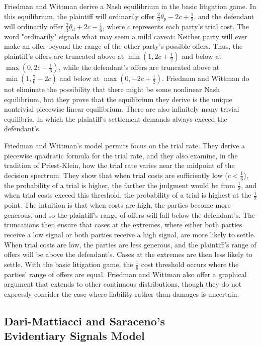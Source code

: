 \documentclass{article}
\begin{document}
Friedman and Wittman derive a Nash equilibrium in the basic litigation game. In this equilibrium, the plaintiff will ordinarily offer $\frac{2}{3}\theta_p -2c + \frac{1}{2}$, and the defendant will ordinarily offer $\frac{2}{3}\theta_d + 2c - \frac{1}{6}$, where $c$ represents each party's trial cost.  The word "ordinarily" signals what may seem a mild caveat: Neither party will ever make an offer beyond the range of the other party's possible offers. Thus, the plaintiff's offers are truncated above at $\min(1, 2c + \frac{1}{2})$ and below at $\max(0, 2c - \frac{1}{6})$, while the defendant's offers are truncated above at $\min(1, \frac{7}{6} - 2c)$ and below at $\max(0, -2c + \frac{1}{2})$. Friedman and Wittman do not eliminate the possibility that there might be some nonlinear Nash equilibrium, but they prove that the equilibrium they derive is the unique nontrivial piecewise linear equilibrium. There are also infinitely many trivial equilibria, in which the plaintiff's settlement demands always exceed the defendant's. 

Friedman and Wittman's model permits focus on the trial rate. They derive a piecewise quadratic formula for the trial rate, and they also examine, in the tradition of Priest-Klein, how the trial rate varies near the midpoint of the decision spectrum. They show that when trial costs are sufficiently low ($c < \frac{1}{6}$), the probability of a trial is higher, the farther the judgment would be from $\frac{1}{2}$, and when trial costs exceed this threshold, the probability of a trial is highest at the $\frac{1}{2}$ point. The intuition is that when costs are high, the parties become more generous, and so the plaintiff's range of offers will fall below the defendant's. The truncations then ensure that cases at the extremes, where either both parties receive a low signal or both parties receive a high signal, are more likely to settle. When trial costs are low, the parties are less generous, and the plaintiff's range of offers will be above the defendant's. Cases at the extremes are then less likely to settle. With the basic litigation game, the $\frac{1}{6}$ cost threshold occurs where the parties' range of offers are equal. Friedman and Wittman also offer a graphical argument that extends to other continuous distributions, though they do not expressly consider the case where liability rather than damages is uncertain.

\subsection{Dari-Mattiacci and Saraceno's \\ Evidentiary Signals Model}
\end{document}
